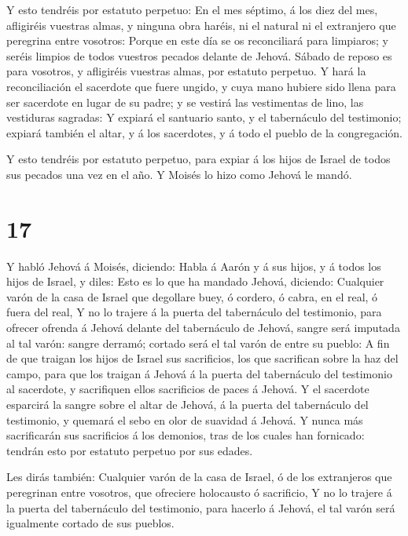  Y esto tendréis por estatuto perpetuo: En el mes séptimo,
á los diez del mes, afligiréis vuestras almas, y ninguna obra haréis, ni
el natural ni el extranjero que peregrina entre vosotros: 
Porque en este día se os reconciliará para limpiaros; y seréis limpios
de todos vuestros pecados delante de Jehová.  Sábado de
reposo es para vosotros, y afligiréis vuestras almas, por estatuto
perpetuo.  Y hará la reconciliación el sacerdote que fuere
ungido, y cuya mano hubiere sido llena para ser sacerdote en lugar de su
padre; y se vestirá las vestimentas de lino, las vestiduras sagradas:
 Y expiará el santuario santo, y el tabernáculo del
testimonio; expiará también el altar, y á los sacerdotes, y á todo el
pueblo de la congregación.

 Y esto tendréis por estatuto perpetuo, para expiar á los
hijos de Israel de todos sus pecados una vez en el año. Y Moisés lo hizo
como Jehová le mandó.

\hypertarget{section-16}{%
\section{17}\label{section-16}}

 Y habló Jehová á Moisés, diciendo:  Habla á
Aarón y á sus hijos, y á todos los hijos de Israel, y diles: Esto es lo
que ha mandado Jehová, diciendo:  Cualquier varón de la casa
de Israel que degollare buey, ó cordero, ó cabra, en el real, ó fuera
del real,  Y no lo trajere á la puerta del tabernáculo del
testimonio, para ofrecer ofrenda á Jehová delante del tabernáculo de
Jehová, sangre será imputada al tal varón: sangre derramó; cortado será
el tal varón de entre su pueblo:  A fin de que traigan los
hijos de Israel sus sacrificios, los que sacrifican sobre la haz del
campo, para que los traigan á Jehová á la puerta del tabernáculo del
testimonio al sacerdote, y sacrifiquen ellos sacrificios de paces á
Jehová.  Y el sacerdote esparcirá la sangre sobre el altar
de Jehová, á la puerta del tabernáculo del testimonio, y quemará el sebo
en olor de suavidad á Jehová.  Y nunca más sacrificarán sus
sacrificios á los demonios, tras de los cuales han fornicado: tendrán
esto por estatuto perpetuo por sus edades.

 Les dirás también: Cualquier varón de la casa de Israel, ó
de los extranjeros que peregrinan entre vosotros, que ofreciere
holocausto ó sacrificio,  Y no lo trajere á la puerta del
tabernáculo del testimonio, para hacerlo á Jehová, el tal varón será
igualmente cortado de sus pueblos.

